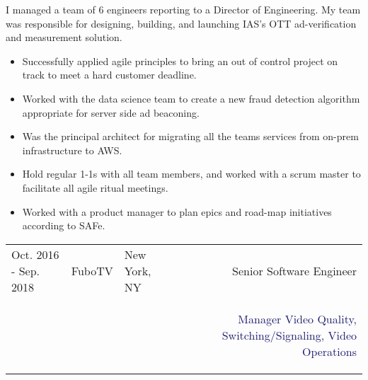 \documentclass{article}
\begin{document}
\vspace{3pt} I managed a team of 6 engineers reporting to a Director of Engineering. My team was responsible for designing, building, and
launching IAS's OTT ad-verification and measurement solution. 
\begin{multicols}{2}
  \begin{small}
    \begin{itemize}[leftmargin=*,label=\tiny{$\bullet$}]
    \item\begin{minipage}[t]{\linewidth}{Successfully applied agile principles to bring an out of control project on track to meet a hard customer deadline.}\end{minipage}
    \item\begin{minipage}[t]{\linewidth}{Worked with the data science team to create a new fraud detection algorithm appropriate for server side ad beaconing.}\end{minipage}
    \item\begin{minipage}[t]{\linewidth}{Was the principal architect for migrating all the teams services from on-prem infrastructure to AWS.}\end{minipage}
    \item\begin{minipage}[t]{\linewidth}{Hold regular 1-1s with all team members, and worked with a scrum master to facilitate all agile ritual meetings.}\end{minipage}
    \item\begin{minipage}[t]{\linewidth}{Worked with a product manager to plan epics and road-map initiatives according to SAFe.}\end{minipage}
    \end{itemize}
  \end{small} 
\end{multicols}

\pagebreak 
\begin{tabularx}{\textwidth}{@{}lllXr}
  Oct. 2016 - Sep. 2018&\textcolor{Mahogany}{FuboTV}&\textcolor{Black!80}{New York, NY}&&\textcolor{MidnightBlue!75}{Senior Software Engineer}\\
  &&&&\textcolor{MidnightBlue}{\begin{minipage}[t]{2in}{Manager Video Quality, Switching/Signaling, Video Operations}\end{minipage}}\\
\end{tabularx}
\end{document}
